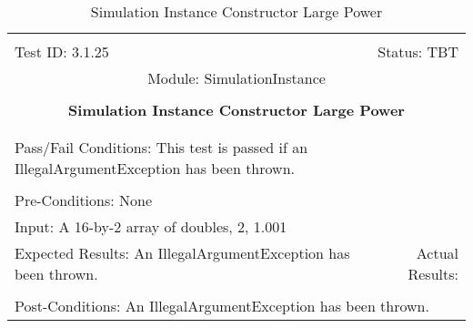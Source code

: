\documentclass[titlepage]{article}
\begin{document}
\begin{center}%
\begin{table}
\begin{tabular}{|l r|}\hline&\\[-2mm]
	Test ID: 3.1.25	&Status: TBT\\[-3mm]
	\multicolumn{2}{|c|}{Module: SimulationInstance}\\&\\
	\multicolumn{2}{|c|}{\textbf{\large{Simulation Instance Constructor Large Power}}}\\&\\\hline&\\[-3mm]
	\multicolumn{2}{|p{\textwidth}|}{Pass/Fail Conditions: This test is passed if an IllegalArgumentException has been thrown.}\\[1mm]\hline&\\[-3mm]
	\multicolumn{2}{|p{\textwidth}|}{Pre-Conditions: None}\\[4mm]
	\multicolumn{2}{|p{\textwidth}|}{Input: A 16-by-2 array of doubles, 2, 1.001}\\[2mm]\hline
	\multicolumn{1}{|p{0.49\textwidth}}{Expected Results: An IllegalArgumentException has been thrown.}	&\multicolumn{1}{|p{0.45\textwidth}|}{Actual Results: }\\\hline&\\[-3mm]
	\multicolumn{2}{|p{\textwidth}|}{Post-Conditions: An IllegalArgumentException has been thrown.}\\\hline
\end{tabular}
\caption{Simulation Instance Constructor Large Power}
\end{table}
\end{center}
\end{document}
